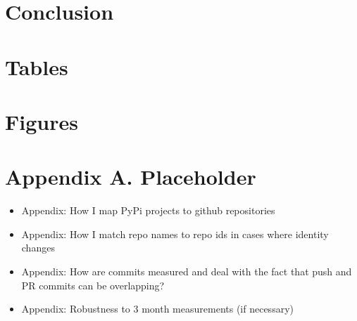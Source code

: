 \documentclass[12pt,notitlepage]{article}
\begin{document}
\section{Conclusion} \label{sec:conclusion}

\newpage
{}
\printbibliography



















\clearpage

\onehalfspacing

\section*{Tables} \label{sec:tab}



\clearpage

\section*{Figures} \label{sec:fig}



\clearpage

\section*{Appendix A. Placeholder} \label{sec:appendixa}



\begin{itemize}
    \item Appendix: How I map PyPi projects to github repositories
    \item Appendix: How I match repo names to repo ids in cases where identity changes
    \item Appendix: How are commits measured and deal with the fact that push and PR commits can be overlapping? 
    \item Appendix: Robustness to 3 month measurements (if necessary)
\end{itemize}
\end{document}
